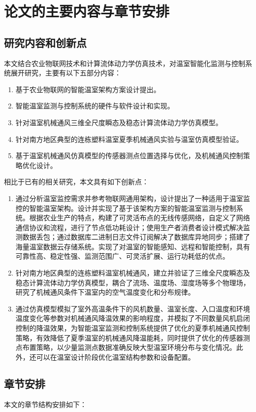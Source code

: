 \section{论文的主要内容与章节安排}
	\subsection{研究内容和创新点}
本文结合农业物联网技术和计算流体动力学仿真技术，对温室智能化监测与控制系统展开研究，主要有以下五部分内容：
		\begin{enumerate}
			\item 基于农业物联网的智能温室架构方案设计提出。
			\item 智能温室监测与控制系统的硬件与软件设计和实现。
			\item 针对温室机械通风三维全尺度瞬态及稳态计算流体动力学仿真模型。
			\item 针对南方地区典型的连栋塑料温室夏季机械通风实验与温室仿真模型验证。
			\item 基于温室机械通风仿真模型的传感器测点位置选择与优化，及机械通风控制策略优化设计。
		\end{enumerate}
		
相比于已有的相关研究，本文具有如下创新点：
		\begin{enumerate}
			\item 通过分析温室监控需求并参考物联网通用架构，设计提出了一种适用于温室监控的智能温室架构。设计并实现了基于该架构方案的智能温室监测与控制系统。根据农业生产的特点，构建了可灵活布点的无线传感网络，自定义了网络通信协议和流程，进行了节点低功耗设计；使用生产者消费者设计模式解决监测数据丢包；通过数据库二进制日志文件订阅解决了数据库异地同步；搭建了海量温室数据云存储系统。实现了对温室的智能感知、远程和智能控制，具有可靠性高、稳定性强、监测范围广、可灵活扩展、运行功耗低的优点。
			\item 针对南方地区典型的连栋塑料温室机械通风，建立并验证了三维全尺度瞬态及稳态计算流体动力学仿真模型，耦合了流场、温度场、湿度场等多个物理场，研究了机械通风条件下温室内的空气温度变化和分布规律。
			\item 通过仿真模型模拟了室外高温条件下的风机数量、温室长度、入口温度和环境温度变化等参数对机械通风降温效果的影响程度，并模拟了不同数量风机启闭控制的降温效果，为智能温室监测和控制系统提供了优化的夏季机械通风控制策略，有效降低了夏季温室的机械通风降温能耗，同时提供了优化的传感器测点布置策略，以少量监测点数据准确反映大型温室环境分布与变化情况。此外，还可以在温室设计阶段优化温室结构参数和设备配置。
		\end{enumerate}	
	\subsection{章节安排}
	本文的章节结构安排如下：
	
